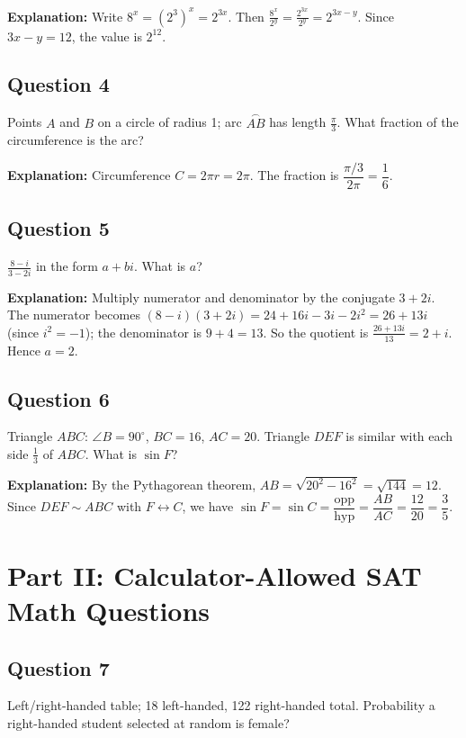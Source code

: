 \textbf{Explanation:} Write $8^x = (2^3)^x = 2^{3x}$. Then $\frac{8^x}{2^y} = \frac{2^{3x}}{2^y} = 2^{3x - y}$. Since $3x - y = 12$, the value is $2^{12}$.

\newpage
\subsection*{Question 4}
Points $A$ and $B$ on a circle of radius 1; arc $\stackrel{\frown}{AB}$ has length $\frac{\pi}{3}$. What fraction of the circumference is the arc?

\textbf{Explanation:} Circumference $C = 2\pi r = 2\pi$. The fraction is $\dfrac{\pi/3}{2\pi} = \dfrac{1}{6}$.

\subsection*{Question 5}
$\displaystyle \frac{8 - i}{3 - 2i}$ in the form $a + bi$. What is $a$?

\textbf{Explanation:} Multiply numerator and denominator by the conjugate $3 + 2i$. The numerator becomes $(8-i)(3+2i) = 24 + 16i - 3i - 2i^2 = 26 + 13i$ (since $i^2 = -1$); the denominator is $9 + 4 = 13$. So the quotient is $\frac{26+13i}{13} = 2 + i$. Hence $a = 2$.

\subsection*{Question 6}
Triangle $ABC$: $\angle B = 90^\circ$, $BC = 16$, $AC = 20$. Triangle $DEF$ is similar with each side $\frac{1}{3}$ of $ABC$. What is $\sin F$?

\textbf{Explanation:} By the Pythagorean theorem, $AB = \sqrt{20^2 - 16^2} = \sqrt{144} = 12$. Since $DEF \sim ABC$ with $F \leftrightarrow C$, we have $\sin F = \sin C = \dfrac{\text{opp}}{\text{hyp}} = \dfrac{AB}{AC} = \dfrac{12}{20} = \dfrac{3}{5}$.

\newpage
\section*{Part II: Calculator-Allowed SAT Math Questions}

\subsection*{Question 7}
Left/right-handed table; 18 left-handed, 122 right-handed total. Probability a right-handed student selected at random is female?


